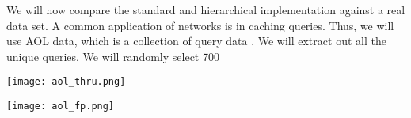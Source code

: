 We will now compare the standard and hierarchical implementation against a real data set.
A common application of networks is in caching queries. Thus, we will use AOL data, which is a collection of query data \cite{AOL}.
We will extract out all the unique queries. We will randomly select 700

\begin{center}
    \texttt{[image: aol\_thru.png]}
\end{center}

\begin{center}
    \texttt{[image: aol\_fp.png]}
\end{center}
